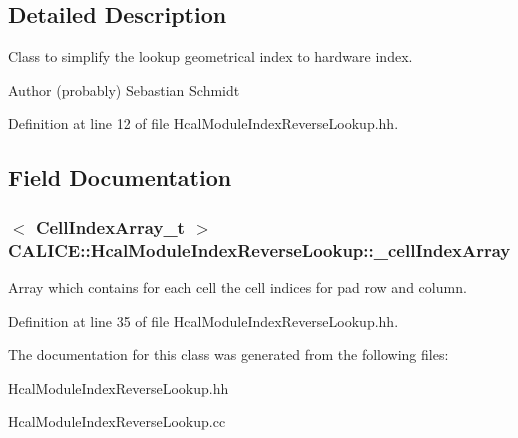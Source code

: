\subsection{Detailed Description}
Class to simplify the lookup geometrical index to hardware index. 

\begin{DoxyAuthor}{Author}
(probably) Sebastian Schmidt 
\end{DoxyAuthor}


Definition at line 12 of file Hcal\-Module\-Index\-Reverse\-Lookup.\-hh.



\subsection{Field Documentation}
\subsubsection[{\-\_\-cell\-Index\-Array}]{$<$ {\bf Cell\-Index\-Array\-\_\-t} $>$ C\-A\-L\-I\-C\-E\-::\-Hcal\-Module\-Index\-Reverse\-Lookup\-::\-\_\-cell\-Index\-Array\hspace{0.3cm}{\ttfamily [protected]}}\label{classCALICE_1_1HcalModuleIndexReverseLookup_a28b33f49d28d85e2fed000e524429e24}


Array which contains for each cell the cell indices for pad row and column. 



Definition at line 35 of file Hcal\-Module\-Index\-Reverse\-Lookup.\-hh.



The documentation for this class was generated from the following files\-:\begin{DoxyCompactItemize}
\item 
Hcal\-Module\-Index\-Reverse\-Lookup.\-hh\item 
Hcal\-Module\-Index\-Reverse\-Lookup.\-cc\end{DoxyCompactItemize}
